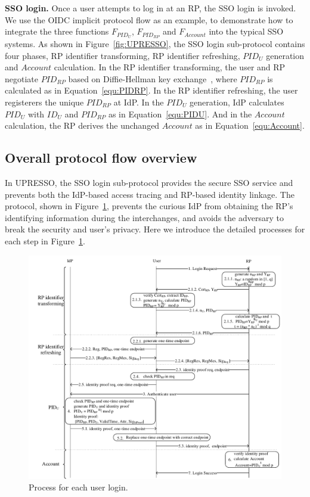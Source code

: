 \vspace{1mm}\noindent\textbf{SSO login.}
Once a user attempts to log in at an RP, the SSO login is invoked. We use the OIDC implicit protocol flow as an example, to demonstrate  how to integrate the three functions $F_{PID_U}$, $F_{PID_{RP}}$ and $F_{Account}$ into the typical SSO systems.
As shown in Figure~\ref{fig:UPRESSO}, the SSO login sub-protocol contains four phases, RP identifier transforming, RP identifier refreshing, $PID_U$ generation and $Account$ calculation.
In the RP identifier transforming, the user and RP negotiate $PID_{RP}$ based on Diffie-Hellman key exchange~\cite{DiffieH76}, where $PID_{RP}$ is calculated as in Equation~\ref{equ:PIDRP}.
In the RP identifier refreshing, the user registerers the unique  $PID_{RP}$ at IdP.
In the $PID_U$ generation, IdP calculates $PID_U$ with $ID_U$ and $PID_{RP}$ as in Equation~\ref{equ:PIDU}.
And in the $Account$ calculation, the RP derives the unchanged $Account$ as in Equation~\ref{equ:Account}.

\subsection{Overall protocol flow overview}
\label{sebsec:loginprocess}
In UPRESSO, the SSO login sub-protocol provides the secure SSO service and prevents both the IdP-based access tracing and RP-based identity linkage.
The protocol, shown in Figure~\ref{fig:process},  prevents the curious IdP from obtaining the RP's identifying information during the interchanges,
  and avoids the adversary to break the security and user's privacy.
Here we introduce the detailed processes for each step in Figure~\ref{fig:process}.

\begin{figure}
  \centering
  \includegraphics[width=0.85\linewidth]{fig/process.pdf}
  \caption{Process for each user login.}
  \label{fig:process}
\end{figure}

